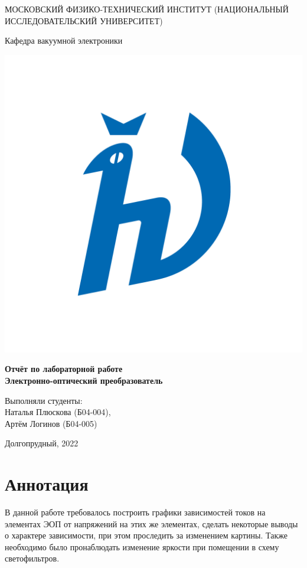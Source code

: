 \begin{titlepage}
\begin{center}
    {\large МОСКОВСКИЙ ФИЗИКО-ТЕХНИЧЕСКИЙ ИНСТИТУТ (НАЦИОНАЛЬНЫЙ ИССЛЕДОВАТЕЛЬСКИЙ УНИВЕРСИТЕТ)}
\end{center}
\begin{center}
    {\large Кафедра вакуумной электроники}
\end{center}


    \vspace{1.5cm}

\begin{center}
    \includegraphics[width=0.4\linewidth]{hv_full.png}
\end{center}
\vspace{0.01cm}
{\Large
\begin{center}
    {\bf
        Отчёт по лабораторной работе\\
        Электронно-оптический преобразователь
    }
\end{center}
}
\vspace{2cm}
\begin{flushright}
{
    \Large Выполняли студенты:\\ 
    \vspace{4mm}
    Наталья Плюскова (Б04-004),\\
    Артём Логинов (Б04-005) \\
}
\end{flushright}
\vfill
\begin{center}
    Долгопрудный, 2022
\end{center}
\end{titlepage}

\newpage


\section*{Аннотация} В данной работе требовалось построить графики зависимостей токов на элементах ЭОП от напряжений на этих же элементах, сделать некоторые выводы о характере зависимости, при этом проследить за изменением картины. Также необходимо было пронаблюдать изменение яркости при помещении в схему светофильтров.


